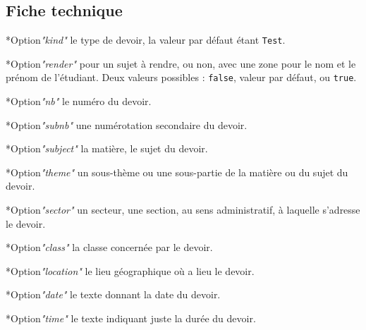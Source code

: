 \documentclass[12pt,a4paper]{scrartcl}
\makeatletter
\theoremstyle{definition}
\newcommand\IDmacro{\@ifstar{\@IDmacroStar}{\@IDmacroNoStar}}
\newcommand\@IDmacroNoStar[3]{%
        \texttt{%
        	\textbackslash#1%
        	\IfStrEq{#2}{0}{}{%
        		\,\,[#2 Option%
				\IfStrEq{#2}{1}{}{s}]%
			}%
    	    \IfStrEq{#3}{}{}{%
	    		\,\,(#3 Argument%
				\IfStrEq{#3}{1}{}{s})%
			}
	   	}
        \immediate\write\tempfile{macro@#1@#2@#3}%
    }
\newcommand\@IDmacroStar[2]{%
        \@IDmacroNoStar{#1}{0}{#2}%
    }
\newcommand\@IDoptarg{\@ifstar{\@IDoptargStar}{\@IDoptargNoStar}}
\newcommand\@IDoptargStar[2]{%
    	\vspace{0.5em}
		--- \texttt{#1%
			\IfStrEq{#2}{}{:}{\,#2:}%
		}%
	}
\newcommand\@IDoptargNoStar[2]{%
    	\IfStrEq{#2}{}{%
			\@IDoptargStar{#1}{}%
		}{%
			\@IDoptargStar{#1}{\##2}%
		}%
	}
\newcommand\IDkey[1]{%
    	\@IDoptarg*{Option}{{\itshape "#1"}}%
	}
\makeatother
\begin{document}
%


	\subsection{Fiche technique}

\IDmacro{exam}{11}{}

\IDkey{kind} le type de devoir, la valeur par défaut étant \verb+Test+.

\IDkey{render} pour un sujet à rendre, ou non, avec une zone pour le nom et le prénom de l'étudiant. Deux valeurs possibles : \verb+false+, valeur par défaut, ou \verb+true+.

\IDkey{nb} le numéro du devoir.

\IDkey{subnb} une numérotation secondaire du devoir.

\IDkey{subject} la matière, le sujet du devoir.

\IDkey{theme} un sous-thème ou une sous-partie de la matière ou du sujet du devoir.

\IDkey{sector} un secteur, une section, au sens administratif, à laquelle s'adresse le devoir.

\IDkey{class} la classe concernée par le devoir.

\IDkey{location} le lieu géographique où a lieu le devoir.

\IDkey{date} le texte donnant la date du devoir.

\IDkey{time} le texte indiquant juste la durée du devoir.




\newcommand\exosoptions{
\IDkey{pts} le nombre de points avec le cas particulier de $0$ qui demande d'afficher "Non noté".

\IDkey{time} la durée de l'exercice.

\IDkey{id} un texte de votre choix pour remplacer le numéro (ceci a pour effet de bloquer temporairement la numérotation).

\IDkey{title} un titre.

\IDkey{note} une petite indication liée à l'exercice (comme par exemple qu'il ne s'adresse qu'aux élèves motivés).

\IDkey{src} la source utilisée pour confectionner l'exercice.
}
\end{document}
